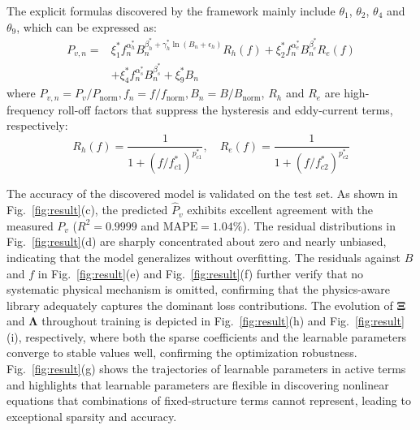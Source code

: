 \documentclass[lettersize,journal]{IEEEtran}
\begin{document}
The explicit formulas discovered by the framework mainly include $\theta_1$, $\theta_2$, $\theta_4$ and $\theta_9$, which can be expressed as:
\begin{equation}
\begin{aligned}
P_{v,n}=& \xi_1^{*} f_{n}^{\alpha_h^{*}}
   B_{n}^{\beta_h^{*} + \gamma_h^{*}\ln(B_n + \epsilon_{h})} R_h(f) + \xi_2^{*} f_{n}^{\alpha_e^{*}}
   B_{n}^{\beta_e^{*}} R_e(f) \\ 
   &+ \xi_4^{*} f_{n}^{\alpha_s^{*}}
   B_{n}^{\beta_s^{*}} + \xi_9^{*}B_{n}
\end{aligned}
\end{equation}
where $P_{v,n}=P_v/P_{\text{norm}}, f_{n}=f/f_{\text{norm}}, B_{n}=B/B_{\text{norm}}$, $R_h$ and $R_e$ are high-frequency roll-off factors that 
suppress the hysteresis and eddy-current terms, respectively:
\begin{equation}
R_h(f) = \frac{1}{1 + (f/f_{c1}^{*})^{p_{c1}^{*}}}, \quad
R_e(f) = \frac{1}{1 + (f/f_{c2}^{*})^{p_{c2}^{*}}}
\end{equation}

The accuracy of the discovered model is validated on the test set. As shown in Fig.~\ref{fig:result}(c), the predicted $\hat{P}_v$ exhibits excellent agreement with the measured $P_v$ ($R^2 = 0.9999$ and $\text{MAPE} = 1.04\%$). The residual distributions in Fig.~\ref{fig:result}(d) are sharply concentrated about zero and nearly unbiased, indicating that the model generalizes without overfitting. The residuals against $B$ and $f$ in Fig.~\ref{fig:result}(e) and Fig.~\ref{fig:result}(f) further verify that no systematic physical mechanism is omitted, confirming that the physics-aware library adequately captures the dominant loss contributions. The evolution of $\mathbf{\Xi}$ and $\mathbf{\Lambda}$ throughout training is depicted in Fig.~\ref{fig:result}(h) and Fig.~\ref{fig:result}(i), respectively, where both the sparse coefficients and the learnable parameters converge to stable values well, confirming the optimization robustness. Fig.~\ref{fig:result}(g) shows the trajectories of learnable parameters in active terms and highlights that learnable parameters are flexible in discovering nonlinear equations that combinations of fixed-structure terms cannot represent, leading to exceptional sparsity and accuracy.   
\end{document}
